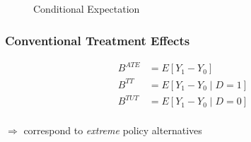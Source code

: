 \begin{frame}

\begin{figure}[htp]\centering
	\caption{Conditional Expectation}\label{eh-Conditional Expectation}
\end{figure}

\end{frame}





\begin{frame}
\frametitle{Conventional Treatment Effects}

\begin{align*}
B^{ATE} & = E[Y_1 - Y_0 ]\\
B^{TT} & = E[Y_1 - Y_0 \mid D = 1]\\
B^{TUT} & = E[Y_1 - Y_0 \mid D = 0]\\
\end{align*}

\(\Rightarrow\) correspond to \emph{extreme} policy alternatives

\end{frame}


